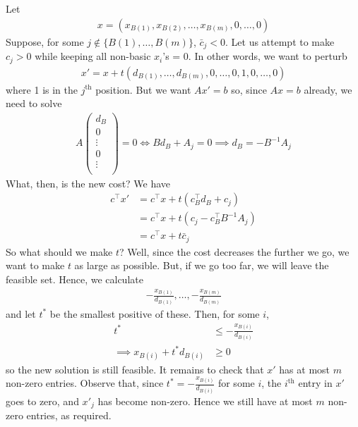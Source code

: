 \documentclass{../template/note}
\begin{document}
    Let
    \begin{align*}
        x = (x_{B(1)}, x_{B(2)}, \dots, x_{B(m)}, 0, \dots, 0)
    \end{align*}
    Suppose, for some $j \notin \{B(1), \dots, B(m)\}$, $\bar c_j < 0$. Let us attempt to make $c_j > 0$ while keeping all non-basic $x_i$'s = 0. In other words, we want to perturb
    \begin{align*}
        x' = x + t(d_{B(1)}, \dots, d_{B(m)}, 0, \dots, 0, 1, 0, \dots, 0)
    \end{align*}
    where 1 is in the $j^\text{th}$ position. But we want $Ax' = b$ so, since $Ax = b$ already, we need to solve
    \begin{align*}
        A \begin{pmatrix}
            d_B \\
            0 \\
            \vdots \\
            0 \\
            \vdots \\
        \end{pmatrix} = 0 \iff Bd_B + A_j = 0 \implies d_B = -B^{-1}A_j
    \end{align*}
    What, then, is the new cost? We have
    \begin{align*}
        c^\intercal x' &= c^\intercal x + t(c_B^\intercal d_B + c_j) \\
        &= c^\intercal x + t(c_j - c_B^\intercal B^{-1}A_j) \\
        &= c^\intercal x + t \bar c_j
    \end{align*}
    So what should we make $t$? Well, since the cost decreases the further we go, we want to make $t$ as large as possible. But, if we go too far, we will leave the feasible set. Hence, we calculate
    \begin{align*}
        -\frac{x_{B(1)}}{d_{B(1)}}, \dots, -\frac{x_{B(m)}}{d_{B(m)}}
    \end{align*}
    and let $t^*$ be the smallest positive of these. Then, for some $i$,
    \begin{align*}
        t^* &\leq -\frac{x_{B(i)}}{d_{B(i)}} \\
        \implies x_{B(i)} + t^*d_{B(i)} &\geq 0
    \end{align*}
    so the new solution is still feasible. It remains to check that $x'$ has at most $m$ non-zero entries. Observe that, since $t^* = -\frac{x_{B(i)}}{d_{B(i)}}$ for some $i$, the $i^\text{th}$ entry in $x'$ goes to zero, and $x'_j$ has become non-zero. Hence we still have at most $m$ non-zero entries, as required.
\end{document}
